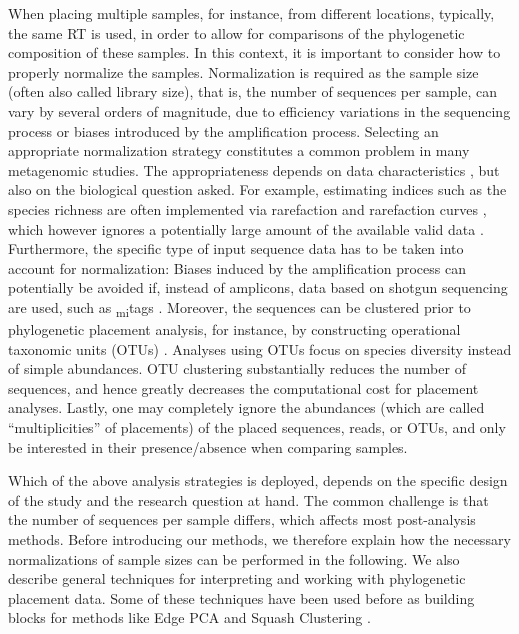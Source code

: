 When placing multiple samples, for instance, from different locations,
typically, the same \ac{RT} is used, in order to allow for comparisons of the phylogenetic composition of these samples.
In this context, it is important to consider how to properly normalize the samples.
Normalization is required as the sample size (often also called library size),
that is, the number of sequences per sample, can vary by several orders of magnitude,
due to efficiency variations in the sequencing process or biases introduced by the amplification process.
Selecting an appropriate normalization strategy constitutes a common problem in many metagenomic studies.
The appropriateness depends on data characteristics \cite{Weiss2017}, but also on the biological question asked.
For example, estimating indices such as the species richness are often implemented
via rarefaction and rarefaction curves \cite{Gotelli2001},
which however ignores a potentially large amount of the available valid data \cite{McMurdie2014}.
Furthermore, the specific type of input sequence data has to be taken into account for normalization:
Biases induced by the amplification process can potentially be avoided if, instead of amplicons,
data based on shotgun sequencing are used, such as \textsubscript{mi}tags \cite{Logares2014}.
Moreover, the sequences can be clustered prior to phylogenetic placement analysis,
for instance, by constructing operational taxonomic units (OTUs) \cite{Edgar2010,Mahe2014,Mahe2015,Rognes2016}.
Analyses using OTUs focus on species diversity instead of simple abundances.
OTU clustering substantially reduces the number of sequences,
and hence greatly decreases the computational cost for placement analyses.
Lastly, one may completely ignore the abundances (which are called ``multiplicities'' of placements) of the placed
sequences, reads, or OTUs, and only be interested in their presence/absence when comparing samples.

Which of the above analysis strategies is deployed,
depends on the specific design of the study and the research question at hand.
The common challenge is that the number of sequences per sample differs, which affects most post-analysis methods.
Before introducing our methods,
we therefore explain how the necessary normalizations of sample sizes can be performed in the following.
We also describe general techniques for interpreting and working with phylogenetic placement data.
Some of these techniques have been used before as building blocks
for methods like Edge PCA and Squash Clustering \cite{Matsen2011a,Evans2012}. 


